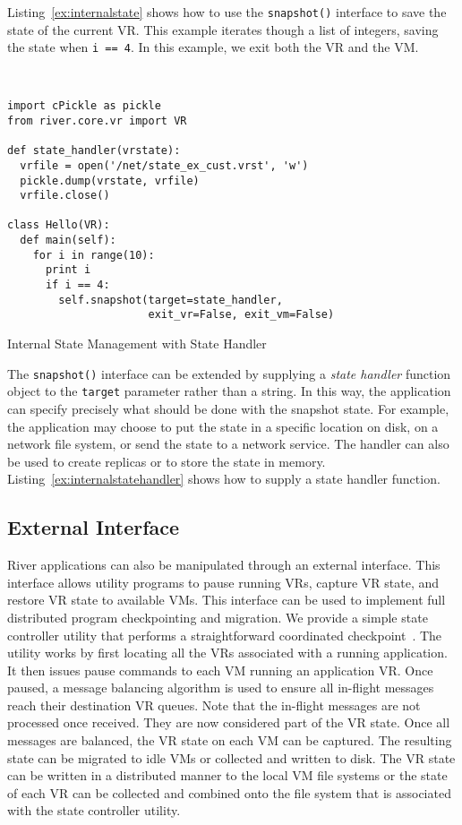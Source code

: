 Listing~\ref{ex:internalstate} shows how to use the \verb+snapshot()+
interface to save the state of the current VR.  This example iterates though a list of integers, saving the state when \verb+i == 4+.  In this example, we exit both the VR and the VM.

\begin{listing}
\scriptsize
\begin{verbatim}


import cPickle as pickle
from river.core.vr import VR

def state_handler(vrstate):
  vrfile = open('/net/state_ex_cust.vrst', 'w')
  pickle.dump(vrstate, vrfile)
  vrfile.close()

class Hello(VR):
  def main(self):
    for i in range(10):
      print i
      if i == 4:
        self.snapshot(target=state_handler,
                      exit_vr=False, exit_vm=False)
\end{verbatim}
\normalsize
\caption{Internal State Management with State Handler}
\label{ex:internalstatehandler}
\end{listing}

The \verb+snapshot()+ interface can be extended by supplying a {\it state handler} function object to the \verb+target+ parameter rather than a string.  In this way, the application can specify precisely what should be done with the snapshot state.  For example, the application may choose to put the state in a specific location on disk, on a network file system, or send the state to a network service.  The handler can also be used to create replicas or to store the state in memory. Listing~\ref{ex:internalstatehandler} shows how to supply a state handler function.

\subsection{External Interface}
\label{sec:ExternalInterface}

River applications can also be manipulated through an external
interface. This interface allows utility programs to pause running VRs,
capture VR state, and restore VR state to available VMs. This interface
can be used to implement full distributed program checkpointing and
migration. We provide a simple state controller utility that performs a
straightforward coordinated checkpoint~\cite{Coti:2006:Checkpointing}.
The utility works by first locating all the VRs associated with a
running application. It then issues pause commands to each VM running an
application VR. Once paused, a message balancing algorithm is used to
ensure all in-flight messages reach their destination VR queues. Note
that the in-flight messages are not processed once received. They are
now considered part of the VR state. Once all messages are balanced, the
VR state on each VM can be captured.  The resulting state can be migrated to idle VMs or collected and written to disk. The VR state can be written in a distributed manner to the local VM file systems or the state of each VR can be collected and combined onto the file system that is associated with the state controller utility.

